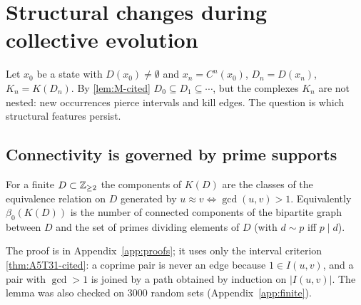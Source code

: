 \section{Structural changes during collective evolution}\label{sec:evolution}
Let $x_0$ be a state with $D(x_0)\ne\emptyset$ and $x_n=C^n(x_0)$, $D_n=D(x_n)$, $K_n=K(D_n)$. By \cref{lem:M-cited} $D_0\subseteq D_1\subseteq\cdots$, but the complexes $K_n$ are not nested: new occurrences pierce intervals and kill edges. The question is which structural features persist.

\subsection{Connectivity is governed by prime supports}
\begin{lemma}\label{lem:comp}
For a finite $D\subset\mathbb Z_{\ge2}$ the components of $K(D)$ are the classes of the equivalence relation on $D$ generated by $u\approx v\iff\gcd(u,v)>1$. Equivalently $\beta_0(K(D))$ is the number of connected components of the bipartite graph between $D$ and the set of primes dividing elements of $D$ (with $d\sim p$ iff $p\mid d$).
\end{lemma}
The proof is in Appendix~\ref{app:proofs}; it uses only the interval criterion \cref{thm:A5T31-cited}: a coprime pair is never an edge because $1\in I(u,v)$, and a pair with $\gcd>1$ is joined by a path obtained by induction on $|I(u,v)|$. The lemma was also checked on $3000$ random sets (Appendix~\ref{app:finite}).
